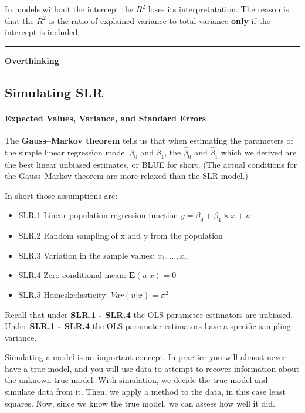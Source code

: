 \documentclass[]{book}
\providecommand{\tightlist}{%
  \setlength{\itemsep}{0pt}\setlength{\parskip}{0pt}}
\let\oldparagraph\paragraph
\renewcommand{\paragraph}[1]{\oldparagraph{#1}\mbox{}}
\begin{document}
In models without the intercept the \(R^2\) loses its interpretatation.
The reason is that the \(R^2\) is the ratio of explained variance to
total variance \textbf{only} if the intercept is included.

\begin{center}\rule{0.5\linewidth}{\linethickness}\end{center}

\textbf{Overthinking}

\hypertarget{simulating-slr}{%
\subsection{Simulating SLR}\label{simulating-slr}}

\hypertarget{expected-values-variance-and-standard-errors}{%
\paragraph{Expected Values, Variance, and Standard
Errors}\label{expected-values-variance-and-standard-errors}}

The \textbf{Gauss--Markov theorem} tells us that when estimating the
parameters of the simple linear regression model \(\beta_{0}\) and
\(\beta_{1}\), the \(\hat{\beta}_{0}\) and \(\hat{\beta}_{1}\) which we
derived are the best linear unbiased estimates, or BLUE for short. (The
actual conditions for the Gauss--Markov theorem are more relaxed than
the SLR model.)

In short those assumptions are:

\begin{itemize}
\tightlist
\item
  SLR.1 Linear population regression function
  \(y = \beta_0 + \beta_{1} \times x + u\)
\item
  SLR.2 Random sampling of x and y from the population\\
\item
  SLR.3 Variation in the sample values: \(x_{1}, \dots , x_{n}\)
\item
  SLR.4 Zero conditional mean: \(\mathbf{E}(u|x) = 0\)
\item
  SLR.5 Homeskedasticity: \(Var(u|x) = \sigma^2\)
\end{itemize}

Recall that under \textbf{SLR.1 - SLR.4} the OLS parameter estimators
are unbiased. Under \textbf{SLR.1 - SLR.4} the OLS parameter estimators
have a specific sampling variance.

Simulating a model is an important concept. In practice you will almost
never have a true model, and you will use data to attempt to recover
information about the unknown true model. With simulation, we decide the
true model and simulate data from it. Then, we apply a method to the
data, in this case least squares. Now, since we know the true model, we
can assess how well it did.
\end{document}
